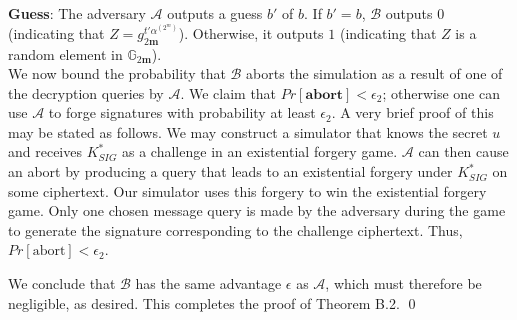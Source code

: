 \noindent \textbf{Guess}: The adversary $\mathcal{A}$ outputs a guess $b'$ of $b$. If $b' = b$, $\mathcal{B}$ outputs $0$ (indicating that $Z=g^{t'\alpha^{(2^m)}}_{2\mathbf{m}}$). Otherwise, it outputs $1$ (indicating that $Z$ is a random element in $\mathbb{G}_{2\mathbf{m}}$).\\ 

\noindent We now bound the probability that $\mathcal{B}$ aborts the simulation as a result of one of the decryption queries by $\mathcal{A}$. We claim that $Pr[\textbf{abort}]<\epsilon_2$; otherwise one can use $\mathcal{A}$ to forge signatures with probability at least $\epsilon_2$. A very brief proof of this may be stated as follows. We may construct a simulator that knows the secret $u$ and receives $K^{*}_{SIG}$ as a challenge in an existential forgery game. $\mathcal{A}$ can then cause an abort by producing a query that leads to an existential forgery under $K^{*}_{SIG}$ on some ciphertext. Our simulator uses this forgery to win the existential forgery game. Only one chosen message query is made by the adversary during the game to generate the signature corresponding to the challenge ciphertext. Thus, $Pr[\text{abort}]<\epsilon_2$.

We conclude that $\mathcal{B}$ has the same advantage $\epsilon$ as $\mathcal{A}$, which must therefore be negligible, as desired. This completes the proof of Theorem B.2. \hfill\qed


